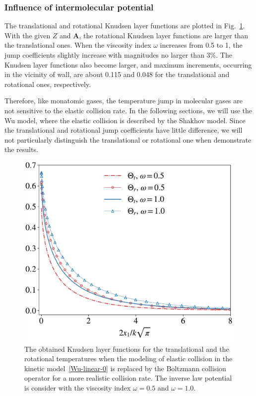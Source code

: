 \subsubsection{Influence of intermolecular potential}\label{sec:elastic}

The translational and rotational Knudsen layer functions are plotted in Fig.~\ref{fig:KLF_w}. With the given $Z$ and $\bm{A}$, the rotational Knudsen layer functions are larger than the translational ones. When the viscosity index $\omega$ increases from 0.5 to 1, the jump coefficients slightly increase with magnitudes no larger than 3\%. The Knudsen layer functions also become larger, and maximum increments, occurring in the vicinity of wall, are about 0.115 and 0.048 for the translational and rotational ones, respectively.

Therefore, like monatomic gases, the temperature jump in molecular gases are not sensitive to the elastic collision rate. In the following sections, we will use the Wu model, where the elastic collision is described by the Shakhov model. Since the translational and rotational jump coefficients have little difference, we will not particularly distinguish the translational or rotational one when demonstrate the results.



\begin{figure}[t]
	\centering
	\includegraphics[width=0.5\columnwidth]{SlipJump/IMG/KLF_w}%
	\caption{The obtained Knudsen layer functions for the translational and the rotational temperatures when the modeling of elastic collision in the kinetic model~\eqref{Wu-linear-0} is replaced by the Boltzmann collision operator for a more realistic collision rate. The inverse law potential is consider with the viscosity index $\omega=0.5$ and $\omega=1.0$. }
	\label{fig:KLF_w}
\end{figure}



